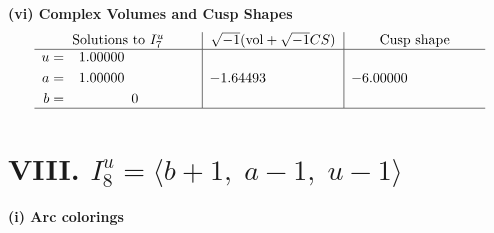 \documentclass[1p]{elsarticle_modified}
\theoremstyle{definition}
\newcommand{\I}{\sqrt{-1}}
\begin{document}
\newpage\flushleft \textbf{(vi) Complex Volumes and Cusp Shapes}
$$\begin{array}{c|c|c}  
\text{Solutions to }I^u_{7}& \I (\text{vol} + \sqrt{-1}CS) & \text{Cusp shape}\\
 \hline 
\begin{aligned}
u &= \phantom{-}1.00000\phantom{ +0.000000I} \\
a &= \phantom{-}1.00000\phantom{ +0.000000I} \\
b &= \phantom{-0.000000 } 0\end{aligned}
 & -1.64493\phantom{ +0.000000I} & -6.00000\phantom{ +0.000000I}\\
 \hline 
 \end{array}$$\newpage\newpage\renewcommand{\arraystretch}{1}
\centering \section*{VIII. $I^u_{8}= \langle b+1,\;a-1,\;u-1 \rangle$}
\flushleft \textbf{(i) Arc colorings}\\
\end{document}
